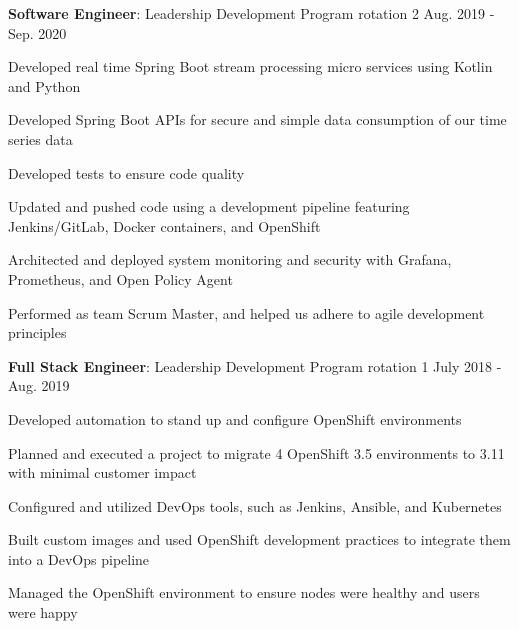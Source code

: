 \begin{cventries}

    \vspace{-1.25em}
    \cventry
    {\textbf{Software Engineer}: Leadership Development Program rotation 2} %
    {} %
    {} %
    {Aug. 2019 - Sep. 2020} %
    { %
        \begin{cvitems}
            \item {Developed real time Spring Boot stream processing micro services using Kotlin and Python}
            \item {Developed Spring Boot APIs for secure and simple data consumption of our time series data}
            \item {Developed tests to ensure code quality}
            \item {Updated and pushed code using a development pipeline featuring Jenkins/GitLab, Docker containers, and OpenShift}
            \item {Architected and deployed system monitoring and security with Grafana, Prometheus, and Open Policy Agent}
            \item {Performed as team Scrum Master, and helped us adhere to agile development principles}
        \end{cvitems}
    }


    \vspace{-1.25em}
    \cventry
    {\textbf{Full Stack Engineer}: Leadership Development Program rotation 1} %
    {} %
    {} %
    {July 2018 - Aug. 2019} %
    { %
        \begin{cvitems}
            \item {Developed automation to stand up and configure OpenShift environments}
            \item {Planned and executed a project to migrate 4 OpenShift 3.5 environments to 3.11 with minimal customer impact}
            \item {Configured and utilized DevOps tools, such as Jenkins, Ansible, and Kubernetes}
            \item {Built custom images and used OpenShift development practices to integrate them into a DevOps pipeline}
            \item {Managed the OpenShift environment to ensure nodes were healthy and users were happy}
        \end{cvitems}
    }


\end{cventries}
